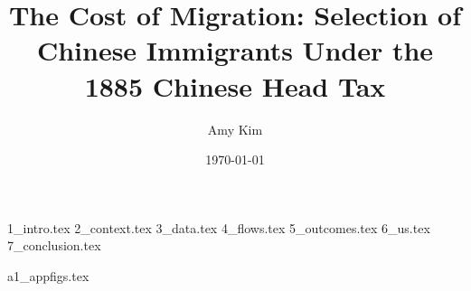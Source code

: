 \documentclass[12pt]{article}
\title{The Cost of Migration: Selection of Chinese Immigrants Under the 1885 Chinese Head Tax}
\author{Amy Kim}
\date{\today}
\begin{document}
\maketitle


{1_intro.tex}
{2_context.tex}
{3_data.tex}
{4_flows.tex}
{5_outcomes.tex}
{6_us.tex}
{7_conclusion.tex}

\newpage


\newpage
\appendix 
{a1_appfigs.tex}
\end{document}
